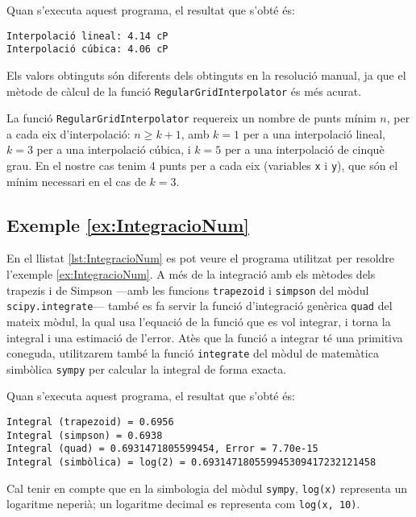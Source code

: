 Quan s'executa aquest programa, el resultat que s'obté és:
\lstset{
	language=,
	numbers=none,
	frame=none
}
\begin{lstlisting}
Interpolació lineal: 4.14 cP
Interpolació cúbica: 4.06 cP
\end{lstlisting} 

Els valors obtinguts són diferents dels obtinguts en la resolució manual, ja que el mètode de càlcul de la funció \texttt{RegularGridInterpolator} és més acurat.

La funció \texttt{RegularGridInterpolator} requereix un nombre de punts  mínim $n$, per a cada eix d'interpolació: $n \geq k+1$, amb $k=1$ per a una interpolació lineal, $k=3$ per a una interpolació cúbica, i $k=5$ per a una interpolació de cinquè grau. En el nostre cas tenim 4 punts per a cada eix (variables \texttt{x} i \texttt{y}), que són el mínim necessari en el cas de $k=3$.

\hypertarget{exemple:IntegracioNum}{\subsection{Exemple \ref*{ex:IntegracioNum} \IntegracioNum}}
En el llistat \vref{lst:IntegracioNum} es pot veure el programa utilitzat per resoldre l'exemple \vref{ex:IntegracioNum}. A més de la integració amb els  mètodes dels trapezis i de Simpson ---amb les funcions \texttt{trapezoid} i \texttt{simpson} del mòdul \texttt{scipy.integrate}--- també es fa servir la funció  d'integració genèrica \texttt{quad} del mateix mòdul,  la qual usa l'equació de la funció que es vol integrar, i torna la integral i una estimació de l'error. Atès que la funció a integrar té una primitiva coneguda, utilitzarem també la funció \texttt{integrate} del mòdul de matemàtica simbòlica \texttt{sympy} per calcular la integral de forma exacta.


Quan s'executa aquest programa, el resultat que s'obté és:
\lstset{
	language=,
	numbers=none,
	frame=none
}
\begin{lstlisting}
Integral (trapezoid) = 0.6956
Integral (simpson) = 0.6938
Integral (quad) = 0.6931471805599454, Error = 7.70e-15
Integral (simbòlica) = log(2) = 0.693147180559945309417232121458
\end{lstlisting} 

Cal tenir en compte que en la simbologia del mòdul \texttt{sympy}, \texttt{log(x)} representa un logaritme neperià; un logaritme decimal es representa com \texttt{log(x, 10)}.

